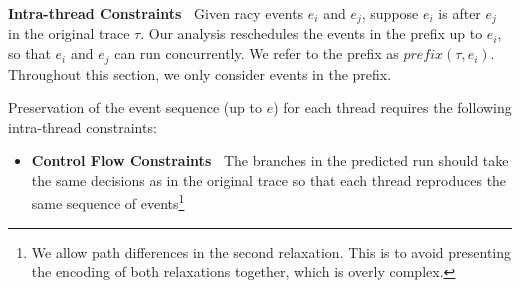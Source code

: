 {\bf Intra-thread Constraints\ } Given racy events $e_i$ and $e_j$, suppose 
$e_i$ is after $e_j$ in the original trace $\tau$. Our analysis reschedules 
the events in the prefix up to $e_i$, so that $e_i$ and $e_j$ can run 
concurrently. We refer to the prefix as $prefix(\tau, e_i)$. Throughout 
this section, we only consider events in the prefix. 

Preservation of the event sequence (up to $e$) for each thread requires 
the following intra-thread constraints:

\begin{itemize}
\item {\bf Control Flow Constraints\ } The branches in the predicted run 
should take the same decisions as in the original trace so that each thread 
reproduces the same sequence of events\footnote{We allow path differences in
the second relaxation. This is to avoid presenting the encoding
of both relaxations together, which is overly complex.} 


\end{itemize}
